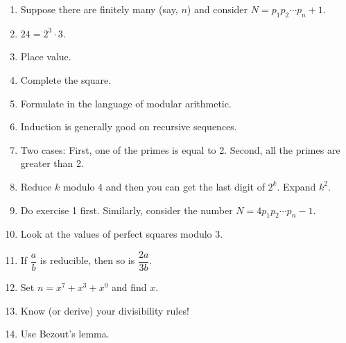 \documentclass{article}
\theoremstyle{definition}
\theoremstyle{remark}
\begin{document}
    \begin{enumerate}
        \item Suppose there are finitely many (say, \(n\)) and consider \(N=p_1p_2\cdots p_n+1\).
        \item \(24=2^3\cdot 3\).
        \item Place value.
        \item Complete the square.
        \item Formulate in the language of modular arithmetic.
        \item Induction is generally good on recursive sequences.
        \item Two cases: First, one of the primes is equal to 2. 
        Second, all the primes are greater than 2.
        \item Reduce \(k\) modulo 4 and then you can get the last digit of \(2^k\). 
        Expand \(k^2\).
        \item Do exercise 1 first.
        Similarly, consider the number \(N=4p_1p_2\cdots p_n-1\).
        \item Look at the values of perfect squares modulo 3.
        \item If \(\dfrac{a}{b}\) is reducible, then so is \(\dfrac{2a}{3b}\).
        \item Set \(n=x^7+x^3+x^0\) and find \(x\).
        \item Know (or derive) your divisibility rules!
        \item Use Bezout's lemma.
    \end{enumerate}
\end{document}
